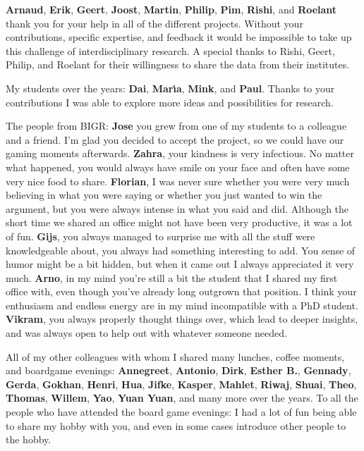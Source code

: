 \textbf{Arnaud}, \textbf{Erik}, \textbf{Geert}, \textbf{Joost}, \textbf{Martin}, \textbf{Philip}, \textbf{Pim}, \textbf{Rishi}, and \textbf{Roelant} thank you for your help in all of the different projects.
Without your contributions, specific expertise, and feedback it would be impossible to take up this challenge of interdisciplinary research.
A special thanks to Rishi, Geert, Philip, and Roelant for their willingness to share the data from their institutes.

My students over the years: \textbf{Dai}, \textbf{Mar{\'\i}a}, \textbf{Mink}, and \textbf{Paul}.
Thanks to your contributions I was able to explore more ideas and possibilities for research.

The people from BIGR:
\textbf{Jose} you grew from one of my students to a colleague and a friend.
I'm glad you decided to accept the project, so we could have our gaming moments afterwards.
\textbf{Zahra}, your kindness is very infectious.
No matter what happened, you would always have smile on your face and often have some very nice food to share.
\textbf{Florian}, I was never sure whether you were very much believing in what you were saying or whether you just wanted to win the argument, but you were always intense in what you said and did.
Although the short time we shared an office might not have been very productive, it was a lot of fun.
\textbf{Gijs}, you always managed to surprise me with all the stuff were knowledgeable about, you always had something interesting to add.
You sense of humor might be a bit hidden, but when it came out I always appreciated it very much.
\textbf{Arno}, in my mind you're still a bit the student that I shared my first office with, even though you've already long outgrown that position.
I think your enthusiasm and endless energy are in my mind incompatible with a PhD student.
\textbf{Vikram}, you always properly thought things over, which lead to deeper insights, and was always open to help out with whatever someone needed.

All of my other colleagues with whom I shared many lunches, coffee moments, and boardgame evenings:
\textbf{Annegreet}, \textbf{Antonio}, \textbf{Dirk}, \textbf{Esther B.}, \textbf{Gennady}, \textbf{Gerda}, \textbf{Gokhan}, \textbf{Henri}, \textbf{Hua}, \textbf{Jifke}, \textbf{Kasper}, \textbf{Mahlet}, \textbf{Riwaj}, \textbf{Shuai}, \textbf{Theo}, \textbf{Thomas}, \textbf{Willem}, \textbf{Yao}, \textbf{Yuan Yuan}, and many more over the years.
To all the people who have attended the board game evenings: I had a lot of fun being able to share my hobby with you, and even in some cases introduce other people to the hobby.

